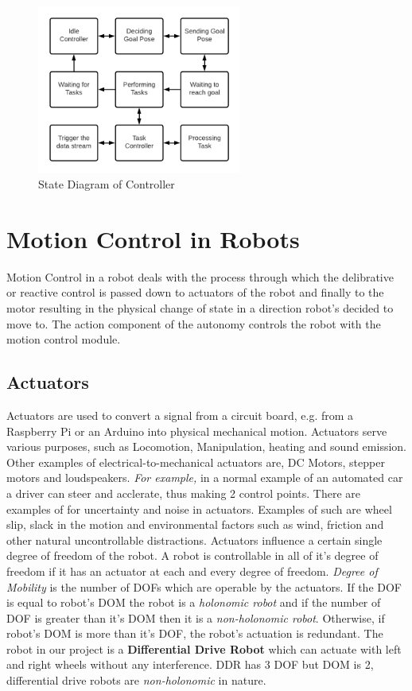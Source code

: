 \begin{figure}[th]
    \centering
    \includegraphics[width=0.6\textwidth]{Figures/controller-process.png}
    \decoRule
    \caption[]{State Diagram of Controller}
    \label{fig:StateDiagController}
\end{figure}

\section{Motion Control in Robots}
Motion Control in a robot deals with the process through which the delibrative or reactive control is passed down to actuators of the robot and finally to the motor resulting in the physical change of state in a direction robot's decided to move to. The action component of the autonomy controls the robot with the motion control module.
\subsection{Actuators}
Actuators are used to convert a signal from a circuit board, e.g. from a Raspberry Pi or an Arduino into physical mechanical motion. Actuators serve various purposes, such as Locomotion, Manipulation, heating and sound emission. 
Other examples of electrical-to-mechanical actuators are, DC Motors, stepper motors and loudspeakers. \textit{For example, } in a normal example of an automated car a driver can steer and acclerate, thus making 2 control points.
There are examples of for uncertainty and noise in actuators. Examples of such are wheel slip, slack in the motion and environmental factors such as wind, friction and other natural uncontrollable distractions. Actuators influence a certain single degree of freedom of the robot.
A robot is controllable in all of it's degree of freedom if it has an actuator at each and every degree of freedom. \textit{Degree of Mobility } is the number of DOFs which are operable by the actuators. If the DOF is equal to robot's DOM the robot is a \textit{holonomic robot} and if the number of DOF is greater than it's DOM then it is a \textit{non-holonomic robot}. Otherwise, if robot's DOM is more than it's DOF, the robot's actuation is redundant.
The robot in our project is a \textbf{Differential Drive Robot} which can actuate with left and right wheels without any interference. DDR has 3 DOF but DOM is 2, differential drive robots are \textit{non-holonomic} in nature.  
